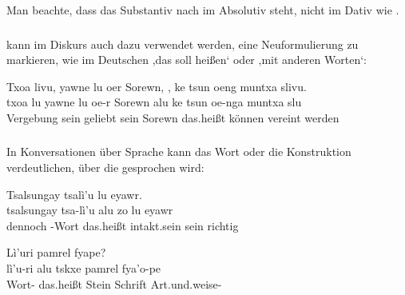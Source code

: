 \noindent Man beachte, dass das Substantiv nach  im Absolutiv steht, nicht im Dativ wie .
\label{syn:conj:alu}

\subsubsection{}  kann im Diskurs auch dazu verwendet werden, eine Neuformulierung zu markieren, wie im Deutschen ,das soll heißen‘ oder ,mit anderen Worten‘:

\begin{interlin}
	\glll \Npawl{}Txoa livu, yawne lu oer Sorewn, , ke tsun oeng muntxa slivu. \\
	txoa lu yawne lu oe-r Sorewn alu ke tsun oe-nga muntxa slu \\
	Vergebung sein geliebt sein  Sorewn das.heißt  können  vereint werden \\
\end{interlin}

\subsubsection{} In Konversationen über Sprache kann  das Wort oder die Konstruktion verdeutlichen, über die gesprochen wird:

\begin{interlin}
	\glll \Npawl{}Tsalsungay tsalì'u   lu eyawr. \\
	tsalsungay tsa-lì'u alu zo lu eyawr \\
	dennoch -Wort das.heißt intakt.sein sein richtig \\
\end{interlin}

\begin{interlin}
	\glll \Npawl{}Lì'uri   pamrel fyape? \\
	lì'u-ri alu tskxe pamrel fya'o-pe \\
	Wort- das.heißt Stein Schrift Art.und.weise- \\
\end{interlin}

